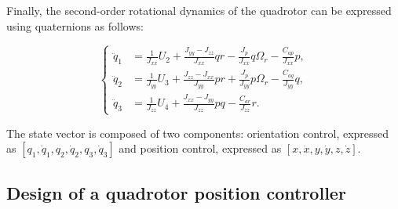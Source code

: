 \begin{small}

Finally, the second-order rotational dynamics of the quadrotor can be expressed using quaternions as follows:


\begin{equation}
\left\{
\begin{aligned}
\ddot{q}_{1} &= \frac{1}{J_{xx}} U_{2} 
+ \frac{J_{yy} - J_{zz}}{J_{xx}} qr 
- \frac{J_{p}}{J_{xx}} q \Omega_{r} 
- \frac{C_{ap}}{J_{xx}} p, \\[8pt]
\ddot{q}_{2} &= \frac{1}{J_{yy}} U_{3} 
+ \frac{J_{zz} - J_{xx}}{J_{yy}} pr 
+ \frac{J_{p}}{J_{yy}} p \Omega_{r} 
- \frac{C_{aq}}{J_{yy}} q, \\[8pt]
\ddot{q}_{3} &= \frac{1}{J_{zz}} U_{4} 
+ \frac{J_{xx} - J_{yy}}{J_{zz}} pq 
- \frac{C_{ar}}{J_{zz}} r.
\end{aligned}
\right.
\label{eq:second-order rotational dynamics}
\end{equation}



The state vector is composed of two components: orientation control, expressed as 
$[q_{1}, \dot{q}_{1}, q_{2}, \dot{q}_{2}, q_{3}, \dot{q}_{3}]$ 
and position control, expressed as 
$[x, \dot{x}, y, \dot{y}, z, \dot{z}]$.


\subsection{Design of a quadrotor position controller}



\end{small}
